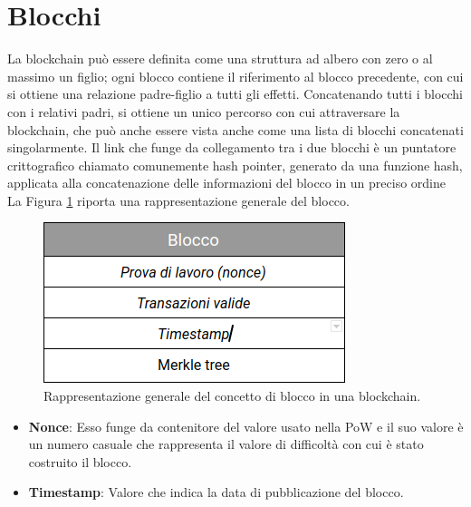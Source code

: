 \section{Blocchi}
\label{sec:blocchi}

La blockchain può essere definita come una struttura ad albero con zero o al massimo un figlio; ogni blocco contiene il riferimento al blocco precedente, con cui si ottiene una relazione padre-figlio a tutti gli effetti.
Concatenando tutti i blocchi con i relativi padri, si ottiene un unico percorso con cui attraversare la blockchain, che può anche essere vista anche come una lista di blocchi concatenati singolarmente.
Il link che funge da collegamento tra i due blocchi è un puntatore crittografico chiamato comunemente hash pointer, generato da una funzione hash, applicata alla concatenazione delle informazioni del blocco in un preciso ordine La Figura \ref{fig:bitcoinblock} riporta una rappresentazione generale del blocco.

\begin{figure}[H]
\begin{center}
\includegraphics[width=0.6\columnwidth]{images/bitcoin-block.png}
\end{center}
\caption{Rappresentazione generale del concetto di blocco in una blockchain.}
\label{fig:bitcoinblock}
\end{figure}

\begin{itemize}
  \item {\bf Nonce\/}: Esso funge da contenitore del valore usato nella PoW e il suo valore è un numero casuale che rappresenta il valore di difficoltà con cui è stato costruito il blocco.
  \item {\bf Timestamp\/}: Valore che indica la data di pubblicazione del blocco.
\end{itemize}

